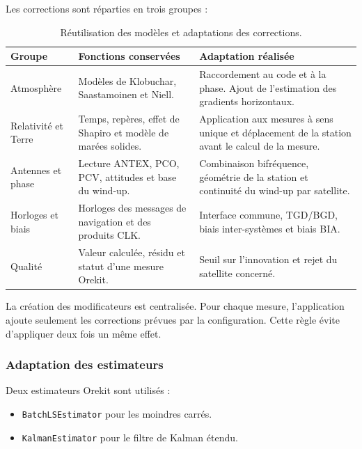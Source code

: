 Les corrections sont réparties en trois groupes :

\begin{table}[htbp]
\centering
\small
\begin{tabularx}{\textwidth}{|>{\raggedright\arraybackslash}p{}|
                                  >{\raggedright\arraybackslash}p{}|
                                  >{\raggedright\arraybackslash}X|}
\hline
\textbf{Groupe} & \textbf{Fonctions conservées} & \textbf{Adaptation réalisée} \\
\hline
Atmosphère & Modèles de Klobuchar, Saastamoinen et Niell. & Raccordement au
code et à la phase. Ajout de l'estimation des gradients horizontaux. \\
\hline
Relativité et Terre & Temps, repères, effet de Shapiro et modèle de marées
solides. & Application aux mesures à sens unique et déplacement de la station
avant le calcul de la mesure. \\
\hline
Antennes et phase & Lecture ANTEX, PCO, PCV, attitudes et base du wind-up. &
Combinaison bifréquence, géométrie de la station et continuité du wind-up par
satellite. \\
\hline
Horloges et biais & Horloges des messages de navigation et des produits CLK. &
Interface commune, TGD/BGD, biais inter-systèmes et biais BIA. \\
\hline
Qualité & Valeur calculée, résidu et statut d'une mesure Orekit. & Seuil sur
l'innovation et rejet du satellite concerné. \\
\hline
\end{tabularx}
\caption{Réutilisation des modèles et adaptations des corrections.}
\label{tab:orekit_modifier_adaptation}
\end{table}

La création des modificateurs est centralisée. Pour chaque mesure, l'application
ajoute seulement les corrections prévues par la configuration. Cette règle
évite d'appliquer deux fois un même effet.

\subsubsection{Adaptation des estimateurs}

Deux estimateurs Orekit sont utilisés :

\begin{itemize}
    \item \texttt{BatchLSEstimator} pour les moindres carrés.
    \item \texttt{KalmanEstimator} pour le filtre de Kalman étendu.
\end{itemize}

